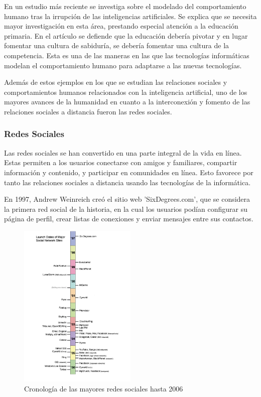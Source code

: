 En un estudio más reciente \citep{benvenuti2023artificial} se investiga sobre el modelado del comportamiento humano tras la irrupción de las inteligencias artificiales. Se explica que se necesita mayor investigación en esta área, prestando especial atención a la educación primaria. En el artículo se defiende que la educación debería pivotar y en lugar fomentar una cultura de sabiduría, se debería fomentar una cultura de la competencia. Esta es una de las maneras en las que las tecnologías informáticas modelan el comportamiento humano para adaptarse a las nuevas tecnologías.

Además de estos ejemplos en los que se estudian las relaciones sociales y comportamientos humanos relacionados con la inteligencia artificial, uno de los mayores avances de la humanidad en cuanto a la interconexión y fomento de las relaciones sociales a distancia fueron las redes sociales.

\subsubsection{Redes Sociales}

Las redes sociales se han convertido en una parte integral de la vida en línea. Estas permiten a los usuarios conectarse con amigos y familiares, compartir información y contenido, y participar en comunidades en línea. Esto favorece por tanto las relaciones sociales a distancia usando las tecnologías de la informática.

En 1997, Andrew Weinreich creó el sitio web 'SixDegrees.com', que se considera la primera red social de la historia, en la cual los usuarios podían configurar su página de perfil, crear listas de conexiones y enviar mensajes entre sus contactos.

\begin{figure}[h]
	\centering
	\includegraphics[width = 0.5\textwidth]{Imagenes/Vectorial/cronologiaRRSS.pdf}
	\caption{Cronología de las mayores redes sociales hasta 2006 \citep{10.1111/j.1083-6101.2007.00393.x}}
	\label{fig:cronologiaRRSS}
\end{figure}

